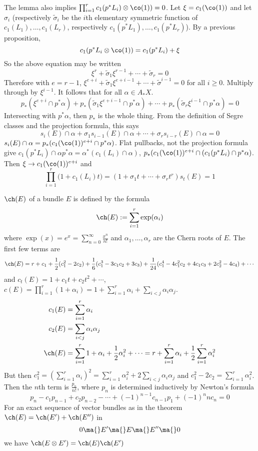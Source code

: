The lemma also implies $\prod_{i=1}^r c_1(p^*L_i) \otimes \co(1))=0$. Let $\xi=c_1(\co(1))$ and let $\sigma_i$ (respectively $\tilde{\sigma}_i$ be the $i$th elementary symmetric function of $c_1(L_1), \ldots, c_1(L_r)$, respectively $c_1(p^*L_1), \ldots,c_1(p^* L_r)$). By a previous proposition,
	\[
	c_1(p^*L_i \otimes \co(1))=c_1(p^*L_i) + \xi
	\]
So the above equation may be written
	\[
	\xi^r + \tilde{\sigma}_1 \xi^{r-1} + \cdots + \tilde{\sigma}_r=0
	\]
Therefore with $e=r-1$, $\xi^{e+i} + \tilde{\sigma}_1 \xi^{e+i-1}+\cdots+\tilde{\sigma}^{i-1}=0$ for all $i \geq 0$. Multiply through by $\xi^{i-1}$. It follows that for all $\alpha \in A_*X$.
	\[
	p_*(\xi^{e+i} \cap p^*\alpha)+p_*(\tilde{\sigma}_1 \xi^{e+i-1} \cap p^*\alpha) + \cdots + p_*(\tilde{\sigma}_r \xi^{i-1} \cap p^*\alpha)=0
	\]
Intersecting with $p^*\alpha$, then $p_*$ is the whole thing. From the definition of Segre classes and the projection formula, this says
	\[
	s_i(E) \cap \alpha + \sigma_1s_{i-1}(E) \cap \alpha + \cdots + \sigma_r s_{i-r}(E) \cap \alpha =0
	\]
$s_i(E) \cap \alpha = p_*(c_1(\co(1))^{e+i} \cap p^*\alpha)$. Flat pullbacks, not the projection formula give $c_1(p^*L_i) \cap \alpha p^*\alpha=\alpha^*(c_1(L_i) \cap \alpha)$, $p_*(c_1(\co(1))^{e+i} \cap (c_1(p^*L_i) \cap p^*\alpha)$. Then $\xi \to c_1(\co(1))^{e+i}$ and
	\[
	\prod_{i=1}^r \big(1+ c_1(L_i)t\big)= (1+\sigma_1t + \cdots + \sigma_r t^r) s_t(E)=1
	\]


\begin{ex}
$\ch(E)$ of a bundle $E$ is defined by the formula
	\[
	\ch(E):= \sum_{i=1}^r \exp(\alpha_i)
	\]
where $\exp(x)=e^x=\sum_{n=0}^\infty \frac{x^n}{n!}$ and $\alpha_1,\ldots,\alpha_r$ are the Chern roots of $E$. The first few terms are 
	\[
	\ch(E)=r + c_1 + \frac{1}{2}(c_1^2-2c_2)+ \frac{1}{6}(c_1^3-3c_1c_2+3c_3) + \frac{1}{24}(c_1^4 - 4c_1^2c_2+4c_1c_3+2c_2^2-4c_4) + \cdots
	\]
and $c_t(E)=1+c_1t+c_2t^2+\cdots$, $c(E)=\prod_{i=1}^r (1+\alpha_i)=1+\sum_{i=1}^r \alpha_i + \sum_{i<j} \alpha_i \alpha_j$.
	\[
	\begin{split}
	c_1(E)&= \sum_{i=1}^r \alpha_i \\
	c_2(E)&= \sum_{i<j} \alpha_i \alpha_j \\
	\ch(E)&= \sum_{i=1}^r 1+ \alpha_i + \frac{1}{2} \alpha_i^2 + \cdots= r+ \sum_{i=1}^r \alpha_i + \frac{1}{2} \sum_{i=1}^r \alpha_i^2	
	\end{split}
	\]
But then $c_1^2=\left(\sum_{i=1}^r \alpha_i\right)^2= \sum_{i=1}^r \alpha_i^2 + 2 \sum_{i<j} \alpha_i \alpha_j$ and $c_1^2-2c_2=\sum_{i=1}^r \alpha_i^2$. Then the $n$th term is $\frac{p_n}{n!}$, where $p_n$ is determined inductively by Newton's formula
	\[
	p_n - c_1p_{n-1} + c_2 p_{n-2} -  \cdots + (-1)^{n-1} c_{n-1} p_1 + (-1)^n n c_n=0
	\]
For an exact sequence of vector bundles as in the theorem $\ch(E)=\ch(E')+\ch(E'')$ in
	\[
	0 \ma{} E' \ma{} E \ma{} E'' \ma{} 0
	\]
we have $\ch(E \otimes E')=\ch(E)\ch(E')$
\end{ex}

